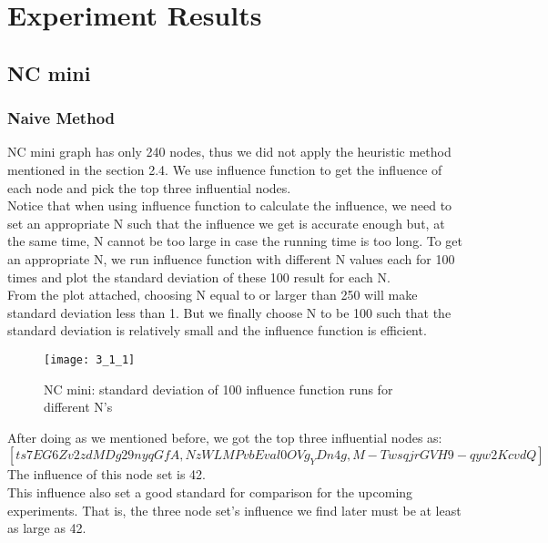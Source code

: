 \documentclass{article}
\begin{document}

\section{Experiment Results}

\FloatBarrier
\subsection{NC mini}   %

\FloatBarrier
\subsubsection{Naive Method}   %
NC mini graph has only 240 nodes, thus we did not apply the heuristic method mentioned in the section 2.4. We use influence function to get the influence of each node and pick the top three influential nodes. \\
Notice that when using influence function to calculate the influence, we need to set an appropriate N such that the influence we get is accurate enough but, at the same time, N cannot be too large in case the running time is too long. To get an appropriate N, we run influence function with different N values each for 100 times and plot the standard deviation of these 100 result for each N. \\
From the plot attached, choosing N equal to or larger than 250 will make standard deviation less than 1. But we finally choose N to be 100 such that the standard deviation is relatively small and the influence function is efficient. \\
\begin{figure}[h]
\begin{center}
\texttt{[image: 3\_1\_1]} %
\caption{NC mini: standard deviation of 100 influence function runs for different N's}
\end{center}
\end{figure}


After doing as we mentioned before, we got the top three influential nodes as: \\
$[ts7EG6Zv2zdMDg29nyqGfA, NzWLMPvbEval0OVg_YDn4g, M-TwsqjrGVH9-qyw2KcvdQ]$ \\
The influence of this node set is 42. \\
This influence also set a good standard for comparison for the upcoming experiments. That is, the three node set's influence we find later must be at least as large as 42.
\end{document}
